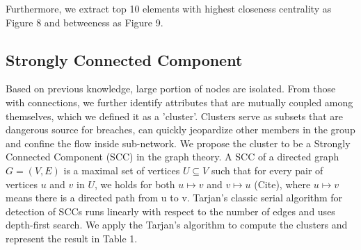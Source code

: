 \documentclass[letterpaper, 10 pt, conference]{ieeeconf}  %
\begin{document}
Furthermore, we extract top 10 elements with highest closeness centrality as Figure 8 and betweeness as Figure 9.





\subsection{Strongly Connected Component}
Based on previous knowledge, large portion of nodes are isolated. From those with connections, we further identify attributes that are mutually coupled among themselves, which we defined it as a 'cluster'. Clusters serve as subsets that are dangerous source for breaches, can quickly jeopardize other members in the group and confine the flow inside sub-network. 
We propose the cluster to be a Strongly Connected Component (SCC) in the graph theory. A SCC of a directed graph $G = (V, E)$ is a maximal set of vertices $U \subseteq V$ such that for every pair of vertices $u$ and $v$ in $U$, we holds for both $u \mapsto v$ and $v \mapsto u$ (Cite), where $u \mapsto v$ means there is a directed path from u to v. Tarjan's classic serial algorithm for detection of SCCs runs linearly with respect to the number of edges and uses depth-first search. We apply the Tarjan's algorithm to compute the clusters and represent the result in Table 1. 
\end{document}
